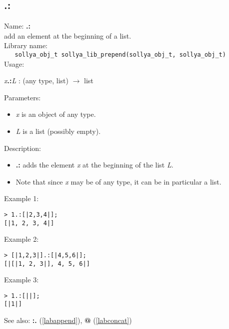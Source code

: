 \subsection{.:}
\label{labprepend}
\noindent Name: \textbf{.:}\\
\phantom{aaa}add an element at the beginning of a list.\\[0.2cm]
\noindent Library name:\\
\verb|   sollya_obj_t sollya_lib_prepend(sollya_obj_t, sollya_obj_t)|\\[0.2cm]
\noindent Usage: 
\begin{center}
\emph{x}\textbf{.:}\emph{L} : (\textsf{any type}, \textsf{list}) $\rightarrow$ \textsf{list}\\
\end{center}
Parameters: 
\begin{itemize}
\item \emph{x} is an object of any type.
\item \emph{L} is a list (possibly empty).
\end{itemize}
\noindent Description: \begin{itemize}

\item \textbf{.:} adds the element \emph{x} at the beginning of the list \emph{L}.

\item Note that since \emph{x} may be of any type, it can be in particular a list.
\end{itemize}
\noindent Example 1: 
\begin{center}\begin{minipage}{15cm}\begin{Verbatim}[frame=single,commandchars=\\\|\~]
> 1.:[|2,3,4|];
[|1, 2, 3, 4|]
\end{Verbatim}
\end{minipage}\end{center}
\noindent Example 2: 
\begin{center}\begin{minipage}{15cm}\begin{Verbatim}[frame=single,commandchars=\\\|\~]
> [|1,2,3|].:[|4,5,6|];
[|[|1, 2, 3|], 4, 5, 6|]
\end{Verbatim}
\end{minipage}\end{center}
\noindent Example 3: 
\begin{center}\begin{minipage}{15cm}\begin{Verbatim}[frame=single,commandchars=\\\|\~]
> 1.:[||];
[|1|]
\end{Verbatim}
\end{minipage}\end{center}
See also: \textbf{:.} (\ref{labappend}), \textbf{@} (\ref{labconcat})
